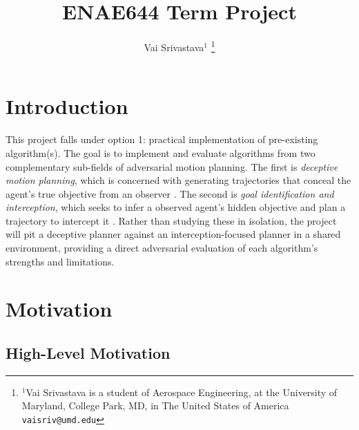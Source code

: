 \documentclass[letterpaper, 10pt, conference]{ieeeconf}
\title{{\LARGE \textbf{ENAE644 Term Project}}}
\author{Vai Srivastava\( ^{1} \)
   \thanks{
      \( ^{1} \)Vai Srivastava is a student of Aerospace Engineering,
      at the University of Maryland, College Park, MD, in The United States of America
      {\tt\small vaisriv@umd.edu}
   }
}
\begin{document}
\maketitle
\thispagestyle{empty}
\pagestyle{empty}


\section{Introduction} \label{sec:introduction}

This project falls under option 1: practical implementation of pre-existing algorithm(s). The goal is to implement and evaluate algorithms from two complementary sub-fields of adversarial motion planning. The first is \emph{deceptive motion planning}, which is concerned with generating trajectories that conceal the agent's true objective from an observer \cite{nichols2022adversarial, xu2020single}. The second is \emph{goal identification and interception}, which seeks to infer a observed agent's hidden objective and plan a trajectory to intercept it \cite{zeng2023recognition, tastan2012learning}. Rather than studying these in isolation, the project will pit a deceptive planner against an interception-focused planner in a shared environment, providing a direct adversarial evaluation of each algorithm's strengths and limitations.

\section{Motivation} \label{sec:motivation}

\subsection{High-Level Motivation} \label{sec:motivation/high-level}
\end{document}
